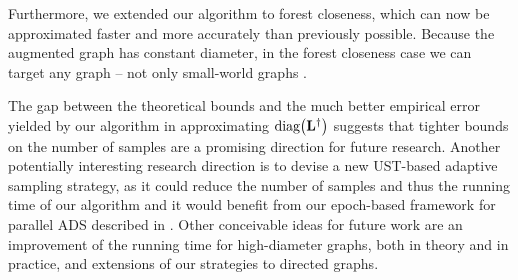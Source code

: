 Furthermore, we extended our algorithm to forest closeness, which can now be
approximated faster and more accurately than previously possible. Because the
augmented graph has constant diameter, in the forest closeness case we can
target any graph -- not only small-world graphs .

The gap between the theoretical bounds and the much better empirical error
yielded by our algorithm in approximating $\diag{\Linv}$ suggests that tighter
bounds on the number of samples are a promising direction for future research.
Another potentially interesting research direction is to devise a new
UST-based adaptive sampling strategy, as it could reduce the number of samples
and thus the running time of our \ust algorithm and it would benefit
from our epoch-based framework for parallel ADS described in
.
Other conceivable ideas for future work are an improvement of the running time
for high-diameter graphs, both in theory and in practice, and extensions of our
strategies to directed graphs.
